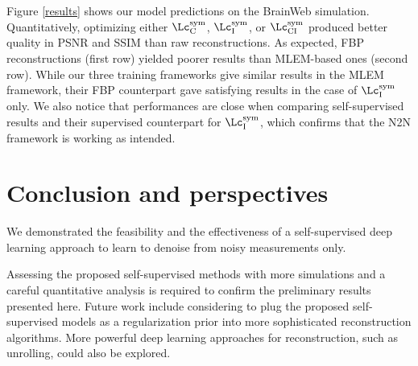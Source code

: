\documentclass{IEEEtran}
\def\sym{^\text{sym}}
\def\ImDom{_\text{I}}
\def\CountDom{_\text{C}}
\def\CI{_\text{CI}}
\begin{document}

Figure \ref{results} shows our model predictions on the BrainWeb simulation.
Quantitatively, optimizing either
$\Lc\sym\CountDom$, $\Lc\sym\ImDom$, or $\Lc\sym\CI$
produced better quality in PSNR and SSIM than raw reconstructions.
As expected, FBP reconstructions (first row) yielded poorer results than MLEM-based ones (second row).
While our three training frameworks give similar results in the MLEM framework, their FBP counterpart gave satisfying results in the case of $\Lc\sym\ImDom$ only.
We also notice that performances are close when comparing self-supervised results and their supervised counterpart for $\Lc\sym\ImDom$, which confirms that the N2N framework is working as intended.

\section{Conclusion and perspectives}

We demonstrated the feasibility and the effectiveness of a self-supervised deep learning approach to learn to denoise %
from noisy measurements only.%

Assessing the proposed self-supervised methods with more simulations and a careful quantitative analysis is required to confirm the preliminary results presented here.
Future work include considering to plug the proposed self-supervised models as a regularization prior into more sophisticated reconstruction algorithms.
More powerful deep learning approaches for reconstruction, such as unrolling, could also be explored.

%

%
\end{document}

